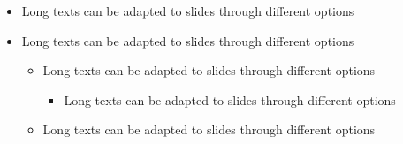 \documentclass[usepdftitle=false,professionalfonts,compress ]{beamer}
\begin{document}
{\begin{frame}[allowframebreaks]
\begin{itemize}
\begin{itemize}
				\end{itemize}

			\item Long texts can be adapted to slides through different options

			\item Long texts can be adapted to slides through different options


	\begin{itemize}

	\item Long texts can be adapted to slides through different options


	\begin{itemize}

	\item Long texts can be adapted to slides through different options

				\end{itemize}

			\item Long texts can be adapted to slides through different options

				\end{itemize}

				\end{itemize}

\end{frame}
}
\end{document}
